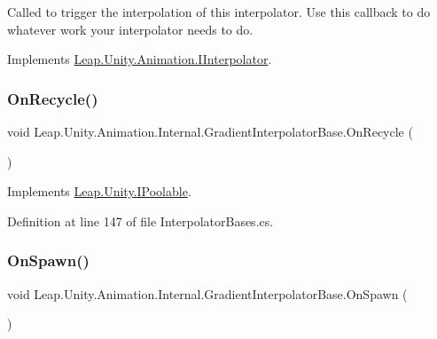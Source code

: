 Called to trigger the interpolation of this interpolator. Use this callback to do whatever work your interpolator needs to do. 



Implements \mbox{\hyperlink{interface_leap_1_1_unity_1_1_animation_1_1_i_interpolator_a4ddd3ea9f35d3f2568921ad2f1112869}{Leap.\+Unity.\+Animation.\+I\+Interpolator}}.

\mbox{\label{class_leap_1_1_unity_1_1_animation_1_1_internal_1_1_gradient_interpolator_base_a4359819686a6c4def43967685c12f09c}} 
\subsubsection{\texorpdfstring{OnRecycle()}{OnRecycle()}}
{\footnotesize\ttfamily void Leap.\+Unity.\+Animation.\+Internal.\+Gradient\+Interpolator\+Base.\+On\+Recycle (\begin{DoxyParamCaption}{ }\end{DoxyParamCaption})}



Implements \mbox{\hyperlink{interface_leap_1_1_unity_1_1_i_poolable_ad509738b2480f85d435b41d05d172bfe}{Leap.\+Unity.\+I\+Poolable}}.



Definition at line 147 of file Interpolator\+Bases.\+cs.

\mbox{\label{class_leap_1_1_unity_1_1_animation_1_1_internal_1_1_gradient_interpolator_base_a51da8752a502f327aaaa8b9d91baf796}} 
\subsubsection{\texorpdfstring{OnSpawn()}{OnSpawn()}}
{\footnotesize\ttfamily void Leap.\+Unity.\+Animation.\+Internal.\+Gradient\+Interpolator\+Base.\+On\+Spawn (\begin{DoxyParamCaption}{ }\end{DoxyParamCaption})}



